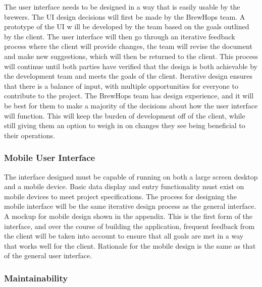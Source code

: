 \documentclass[draftclsnofoot,onecolumn,letterpaper,10pt]{IEEEtran}
\begin{document}
			The user interface needs to be designed in a way that is easily usable by the brewers.
			The UI design decisions will first be made by the BrewHops team.
			A prototype of the UI w ill be developed by the team based on the goals outlined by the client.
			The user interface will then go through an iterative feedback process where the client will provide changes, the team will revise the document and make new suggestions, which will then be returned to the client.
			This process will continue until both parties have verified that the design is both achievable by the development team and meets the goals of the client.
			Iterative design ensures that there is a balance of input, with multiple opportunities for everyone to contribute to the project.
			The BrewHops team has design experience, and it will be best for them to make a majority of the decisions about how the user interface will function.
			This will keep the burden of development off of the client, while still giving them an option to weigh in on changes they see being beneficial to their operations.

			\subsubsection{Mobile User Interface}

				The interface designed must be capable of running on both a large screen desktop and a mobile device.
				Basic data display and entry functionality must exist on mobile devices to meet project specifications.
				The process for designing the mobile interface will be the same iterative design process as the general interface.
				A mockup for mobile design shown in the appendix.
				This is the first form of the interface, and over the course of building the application, frequent feedback from the client will be taken into account to ensure that all goals are met in a way that works well for the client.
				Rationale for the mobile design is the same as that of the general user interface.

			\subsubsection{Maintainability}
\end{document}
